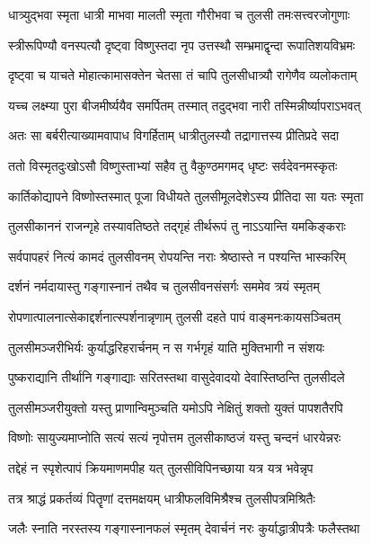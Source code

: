 \twolineshloka
{धात्र्युद्भवा स्मृता धात्री माभवा मालती स्मृता}
{गौरीभवा च तुलसी तमःसत्त्वरजोगुणाः} %

\twolineshloka
{स्त्रीरूपिण्यौ वनस्पत्यौ दृष्ट्वा विष्णुस्तदा नृप}
{उत्तस्थौ सम्भ्रमाद्वृन्दा रूपातिशयविभ्रमः} %

\twolineshloka
{दृष्ट्वा च याचते मोहात्कामासक्तेन चेतसा}
{तं चापि तुलसीधात्र्यौ रागेणैव व्यलोकताम्} %

\twolineshloka
{यच्च लक्ष्म्या पुरा बीजमीर्ष्ययैव समर्पितम्}
{तस्मात् तदुद्भवा नारी तस्मिन्नीर्ष्यापराऽभवत्} %

\twolineshloka
{अतः सा बर्बरीत्याख्यामवापाध विगर्हिताम्}
{धात्रीतुलस्यौ तद्रागात्तस्य प्रीतिप्रदे सदा} %

\twolineshloka
{ततो विस्मृतदुःखोऽसौ विष्णुस्ताभ्यां सहैव तु}
{वैकुण्ठमगमद् धृष्टः सर्वदेवनमस्कृतः} %

\twolineshloka
{कार्तिकोद्यापने विष्णोस्तस्मात् पूजा विधीयते}
{तुलसीमूलदेशेऽस्य प्रीतिदा सा यतः स्मृता} %

\twolineshloka
{तुलसीकाननं राजन्गृहे तस्यावतिष्ठते}
{तद्गृहं तीर्थरूपं तु नाऽऽयान्ति यमकिङ्कराः} %

\twolineshloka
{सर्वपापहरं नित्यं कामदं तुलसीवनम्}
{रोपयन्ति नराः श्रेष्ठास्ते न पश्यन्ति भास्करिम्} %

\twolineshloka
{दर्शनं नर्मदायास्तु गङ्गास्नानं तथैव च}
{तुलसीवनसंसर्गः सममेव त्रयं स्मृतम्} %

\twolineshloka
{रोपणात्पालनात्सेकाद्दर्शनात्स्पर्शनान्नृणाम्}
{तुलसी दहते पापं वाङ्मनःकायसञ्चितम्} %

\twolineshloka
{तुलसीमञ्जरीभिर्यः कुर्याद्धरिहरार्चनम्}
{न स गर्भगृहं याति मुक्तिभागी न संशयः} %

\twolineshloka
{पुष्कराद्यानि तीर्थानि गङ्गाद्याः सरितस्तथा}
{वासुदेवादयो देवास्तिष्ठन्ति तुलसीदले} %

\twolineshloka
{तुलसीमञ्जरीयुक्तो यस्तु प्राणान्विमुञ्चति}
{यमोऽपि नेक्षितुं शक्तो युक्तं पापशतैरपि} %

\twolineshloka
{विष्णोः सायुज्यमाप्नोति सत्यं सत्यं नृपोत्तम}
{तुलसीकाष्ठजं यस्तु चन्दनं धारयेन्नरः} %

\twolineshloka
{तद्देहं न स्पृशेत्पापं क्रियमाणमपीह यत्}
{तुलसीविपिनच्छाया यत्र यत्र भवेन्नृप} %

\twolineshloka
{तत्र श्राद्धं प्रकर्तव्यं पितॄणां दत्तमक्षयम्}
{धात्रीफलविमिश्रैश्च तुलसीपत्रमिश्रितैः} %

\twolineshloka
{जलैः स्नाति नरस्तस्य गङ्गास्नानफलं स्मृतम्}
{देवार्चनं नरः कुर्याद्धात्रीपत्रैः फलैस्तथा} %

